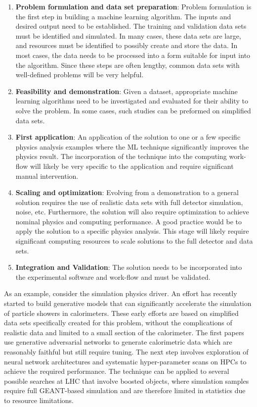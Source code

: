 \begin{enumerate}
 \item \textbf{Problem formulation and data set preparation}: Problem formulation is the first step in building a machine learning algorithm. The inputs and desired output need to be established. The training and validation data sets must be identified and simulated. In many cases, these data sets are large, and resources must be identified to possibly create and store the data. In most cases, the data needs to be processed into a form suitable for input into the algorithm. Since these steps are often lengthy, common data sets with well-defined problems will be very helpful.
 \item \textbf{Feasibility and demonstration}: Given a dataset, appropriate machine learning algorithms need to be investigated and evaluated for their ability to solve the problem. In some cases, such studies can be preformed on simplified data sets.
 \item \textbf{First application}: An application of the solution to one or a few specific physics analysis examples where the ML technique significantly improves the physics result. The incorporation of the technique into the computing work-flow will likely be very specific to the application and require significant manual intervention.
 \item \textbf{Scaling and optimization}: Evolving from a demonstration to a general solution requires the use of realistic data sets with full detector simulation, noise, etc. Furthermore, the solution will also require optimization to achieve nominal physics and computing performance. A good practice would be to apply the solution to a specific physics analysis. This stage will likely require significant computing resources to scale solutions to the full detector and data sets.
 \item \textbf{Integration and Validation}: The solution needs to be incorporated into the experimental software and work-flow and must be validated.
\end{enumerate}

As an example, consider the simulation physics driver. An effort has recently started to build generative models that can significantly accelerate the simulation of particle showers in calorimeters.
These early efforts are based on simplified data sets specifically created for this problem, without the complications of realistic data and limited to a small section of the calorimeter.
The first papers~\cite{Paganini:2017hrr} use generative adversarial networks to generate calorimetric data which are reasonably faithful but still require tuning. The next step involves exploration of neural network architectures and systematic hyper-parameter scans on HPCs to achieve the required performance.
The technique can be applied to several possible searches at LHC that involve boosted objects, where simulation samples require full GEANT-based simulation and are therefore limited in statistics due to resource limitations.

